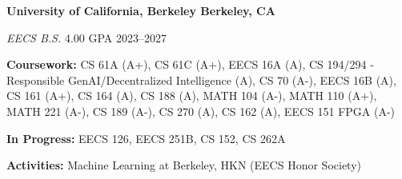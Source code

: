 \textbf{University of California, Berkeley \hfill Berkeley, CA} \par
\textit{EECS B.S.} 4.00 GPA \hfill 2023--2027\par
\textbf{Coursework:}
CS 61A (A+),
CS 61C (A+),
EECS 16A (A),
CS 194/294 - Responsible GenAI/Decentralized Intelligence (A),
CS 70 (A-), EECS 16B (A), CS 161 (A+), CS 164 (A), CS 188 (A),
MATH 104 (A-), MATH 110 (A+), MATH 221 (A-), CS 189 (A-), CS 270 (A), CS 162 (A), EECS 151 FPGA (A-) \par
\textbf{In Progress:}
EECS 126, EECS 251B, CS 152, CS 262A\par
\textbf{Activities:} Machine Learning at Berkeley, HKN (EECS Honor Society)